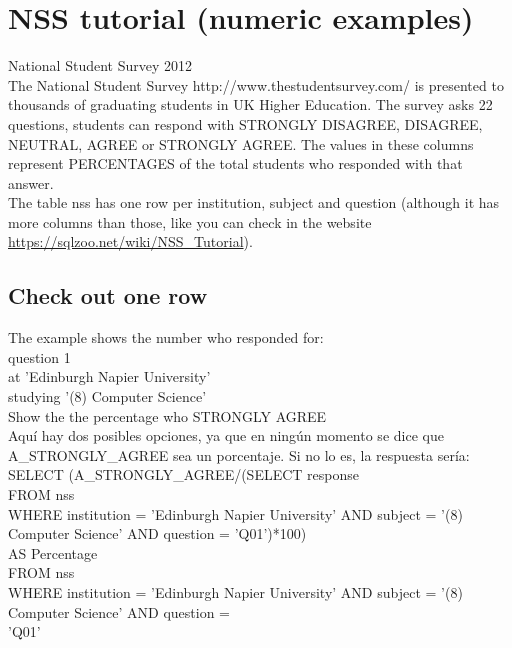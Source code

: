 \documentclass[10pt, oneside]{article}
\begin{document}
\section{NSS tutorial (numeric examples)}

National Student Survey 2012\\

The National Student Survey http://www.thestudentsurvey.com/ is presented to thousands of graduating students in UK Higher Education. The survey asks 22 questions, students can respond with STRONGLY DISAGREE, DISAGREE, NEUTRAL, AGREE or STRONGLY AGREE. The values in these columns represent PERCENTAGES of the total students who responded with that answer.\\

The table nss has one row per institution, subject and question (although it has more columns than those, like you can check in the website \hyperref{https://sqlzoo.net/wiki/NSS\_Tutorial}{}{}{https://sqlzoo.net/wiki/NSS\_Tutorial}).\\

\subsection{Check out one row}

The example shows the number who responded for:\\

question 1\\
at 'Edinburgh Napier University'\\
studying '(8) Computer Science'\\
Show the the percentage who STRONGLY AGREE\\

Aquí hay dos posibles opciones, ya que en ningún momento se dice que A\_STRONGLY\_AGREE sea un porcentaje. Si no lo es, la respuesta sería:\\

SELECT (A\_STRONGLY\_AGREE/(SELECT response \\
FROM nss \\
WHERE institution = 'Edinburgh Napier University' AND subject = '(8) Computer Science' AND question =     'Q01')*100) \\
AS Percentage \\
FROM nss\\
WHERE institution = 'Edinburgh Napier University' AND subject = '(8) Computer Science' AND question = \\
'Q01' \\
\end{document}
